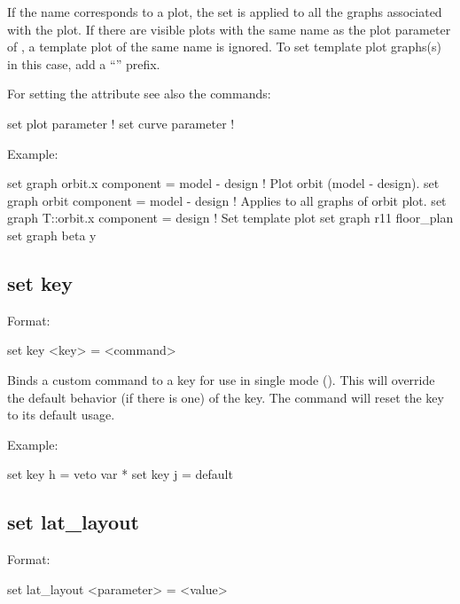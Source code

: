 {{If the  name corresponds to a plot, the set is applied to all the graphs associated with
the plot. If there are visible plots with the same name as the plot parameter of , a
template plot of the same name is ignored. To set template plot graphs(s) in this case, add a
``'' prefix.

For setting the  attribute see also the commands:
\begin{example}
  set plot parameter      ! 
  set curve parameter     ! 
\end{example}

Example:
\begin{example}
  set graph orbit.x component = model - design  ! Plot orbit (model - design).
  set graph orbit component = model - design    ! Applies to all graphs of orbit plot.
  set graph T::orbit.x component = design       ! Set template plot
  set graph r11 floor_plan%
  set graph beta y%
\end{example}


\subsection{set key}
\label{s:set.key}

Format:
\begin{example}
  set key <key> = <command>
\end{example}

Binds a custom command to a key for use in single mode ().  This will override the
default behavior (if there is one) of the key.  The command  will reset the key to its
default usage.

Example:
\begin{example}
  set key h = veto var *
  set key j = default
\end{example}



\subsection{set lat_layout}
\label{s:set.lat.layout}

Format:
\begin{example}
  set lat_layout <parameter> = <value>
\end{example}

}}
